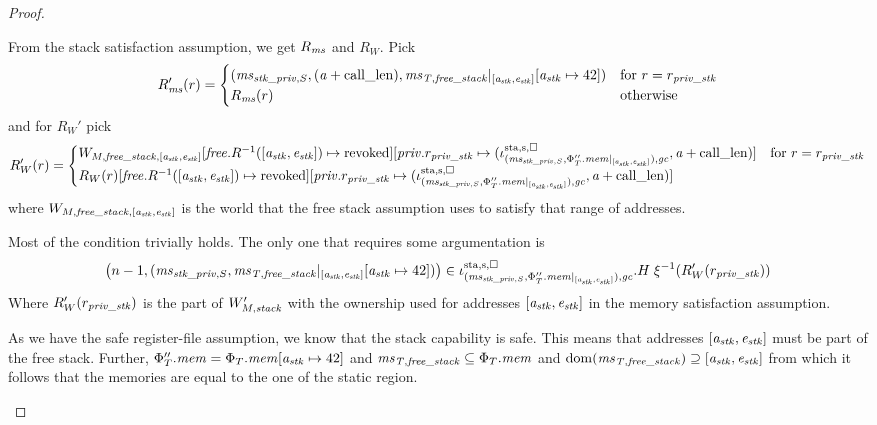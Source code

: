 \begin{proof}
\begin{itemize}
    From the stack satisfaction assumption, we get $R_\ms$ and $R_W$. Pick
    \[
      R_\ms'(r) =
      \begin{cases}
        (\ms_{\stk\_\priv,S}, (\aaddr+\calllen),\ms_\var{T,free\_stack}|_{[\aaddr_\stk,\eaddr_\stk]}\update{\aaddr_\stk}{42})& \text{for $r = r_\var{priv\_stk}$}\\
        R_\ms(r) & \totherwise
      \end{cases}
    \]
    and for $R_W'$ pick
    \[
      R_W'(r) =
      \begin{cases}
        W_{M,\var{free\_stack},[\aaddr_\stk,\eaddr_\stk]}[\free.R^{-1}([\aaddr_\stk,\eaddr_\stk]) \mapsto \revoked][\priv.r_\var{priv\_stk} \mapsto (\stareg[(\ms_{\stk\_\priv,S},\Phi_T''.\mem|_{[\aaddr_\stk,\eaddr_\stk]}),\gc]{\spa,\square},\aaddr+\calllen)]
        & \text{for $r = r_\var{priv\_stk}$} \\
        R_W(r)[\free.R^{-1}([\aaddr_\stk,\eaddr_\stk]) \mapsto \revoked][\priv.r_\var{priv\_stk} \mapsto (\stareg[(\ms_{\stk\_\priv,S},\Phi_T''.\mem|_{[\aaddr_\stk,\eaddr_\stk]}),\gc]{\spa,\square},\aaddr+\calllen)] &
      \end{cases}
    \]
    where $W_{M,\var{free\_stack},[\aaddr_\stk,\eaddr_\stk]}$ is the world that the free stack assumption uses to satisfy that range of addresses.

    Most of the condition trivially holds. 
    The only one that requires some argumentation is
    \[
      \npair[n-1]{(\ms_{\stk\_\priv,S},\ms_\var{T,free\_stack}|_{[\aaddr_\stk,\eaddr_\stk]}\update{\aaddr_\stk}{42})}
      \in
      \stareg[(\ms_{\stk\_\priv,S},\Phi_T''.\mem|_{[\aaddr_\stk,\eaddr_\stk]}),\gc]{\spa,\square}.H
      \; \xi^{-1}(R_W'(r_\var{priv\_stk}))
    \]
    Where $R_W'(r_\var{priv\_stk})$ is the part of $W_{M,\var{stack}}'$ with the ownership used for addresses $[\aaddr_\stk, \eaddr_\stk]$ in the memory satisfaction assumption.

    As we have the safe register-file assumption, we know that the stack capability is safe.
    This means that addresses $[\aaddr_\stk,\eaddr_\stk]$ must be part of the free stack.
    Further, $\Phi''_T.\mem = \Phi_T.\mem\update{\aaddr_\stk}{42}$ and $\ms_\var{T,free\_stack} \subseteq \Phi_T.\mem$ and $\dom(\ms_\var{T,free\_stack}) \supseteq [\aaddr_\stk,\eaddr_\stk]$ from which it follows that the memories are equal to the one of the static region.


\end{itemize}
\end{proof}
